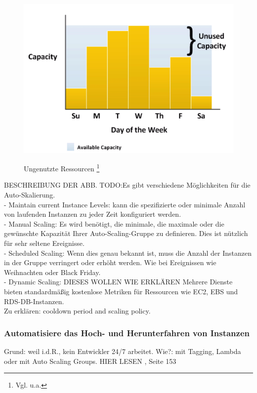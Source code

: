 \begin{figure}
    \centering
    \includegraphics[scale=0.7]{sources/AutoCap Unused Capacity}
    \caption{}\label{fig:AutoSca_Unused_Capacity} Ungenutzte Ressourcen
    \footnote{Vgl. u.a.\cite{AMZ01}}
  \end{figure}
  BESCHREIBUNG DER ABB.
TODO:Es gibt verschiedene Möglichkeiten für die Auto-Skalierung.
\\
- Maintain current Instance Levels: kann die spezifizierte oder minimale Anzahl von laufenden Instanzen zu jeder Zeit konfiguriert werden.
\\
- Manual Scaling: Es wird benötigt, die minimale, die maximale oder die gewünschte Kapazität Ihrer Auto-Scaling-Gruppe zu definieren. Dies ist nützlich für sehr seltene Ereignisse. 
\\
- Scheduled Scaling: Wenn dies genau bekannt ist, muss die Anzahl der Instanzen in der Gruppe verringert oder erhöht werden. Wie bei Ereignissen wie Weihnachten oder Black Friday.
\\
- Dynamic Scaling: DIESES WOLLEN WIE ERKLÄREN
Mehrere Dienste bieten standardmäßig kostenlose Metriken für Ressourcen wie EC2, EBS und RDS-DB-Instanzen.
\\
Zu erklären: cooldown period and scaling policy.


\subsubsection{Automatisiere das Hoch- und Herunterfahren von Instanzen}
Grund: weil i.d.R., kein Entwickler 24/7 arbeitet.
Wie?: mit Tagging, Lambda oder mit Auto Scaling Groups.
HIER LESEN {\cite{CCB}, Seite 153}

